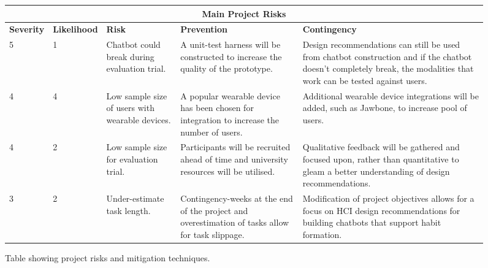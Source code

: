 \begin{landscape}
\renewcommand{\arraystretch}{1.5} %

\begin{figure}[ht]
\begin{center}
\begin{tabular}{ |p{1.35cm}|p{1.8cm}|p{4cm}|p{4.7cm}|p{7cm}| }
  \hline \multicolumn{5}{|c|}{Main Project Risks} \\ \hline %
  \textbf{\small{Severity}} & \textbf{\small{Likelihood}} & \textbf{\small{Risk}} & \textbf{\small{Prevention}} & \textbf{\small{Contingency}} \\ \hline %
  5 & 1 & Chatbot could break during evaluation trial. & A unit-test harness will be constructed to increase the quality of the prototype. & Design recommendations can still be used from chatbot construction and if the chatbot doesn't completely break, the modalities that work can be tested against users. \\ \hline
  4 & 4 & Low sample size of users with wearable devices. & A popular wearable device has been chosen for integration to increase the number of users. & Additional wearable device integrations will be added, such as Jawbone, to increase pool of users. \\ \hline
  4 & 2 & Low sample size for evaluation trial. & Participants will be recruited ahead of time and university resources will be utilised. & Qualitative feedback will be gathered and focused upon, rather than quantitative to gleam a better understanding of design recommendations.\\ \hline
  3 & 2 & Under-estimate task length. & Contingency-weeks at the end of the project and overestimation of tasks allow for task slippage. & Modification of project objectives allows for a focus on HCI design recommendations for building chatbots that support habit formation. \\ \hline
\end{tabular}
\end{center}
\caption{Table showing project risks and mitigation techniques.}
\end{figure}
\end{landscape}
